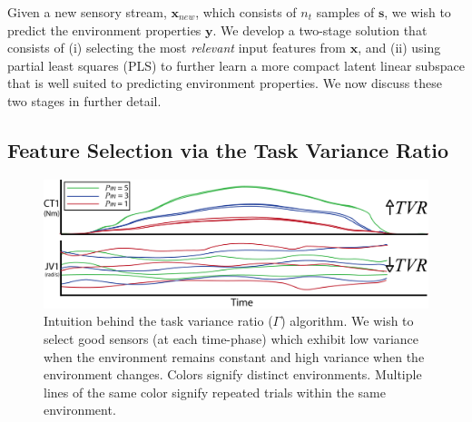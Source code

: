 


Given a new sensory stream, $\mathbf{x}_{new}$, which consists of $n_t$ samples of $\mathbf{s}$, we wish to predict the environment properties $\mathbf{y}$.
We develop a two-stage solution that consists of 
(i) selecting the most {\em relevant} input features from $\mathbf{x}$, and 
(ii) using partial least squares (PLS) to further learn a more compact latent linear subspace that is well suited to predicting environment properties.
We now discuss these two stages in further detail.

\subsection{Feature Selection via the Task Variance Ratio}
\label{sec:feature_selection}

\begin{figure}[tb]
  \centering
  \includegraphics[width=\linewidth]{images/TVR_intuition}
  \caption{Intuition behind the task variance ratio ($\Gamma$) algorithm. We wish to select good sensors (at each time-phase) which exhibit low variance when the environment remains constant and high variance when the environment changes. Colors signify distinct environments. Multiple lines of the same color signify repeated trials within the same environment.}
  \label{fig:TVR_intuition}
\end{figure}

